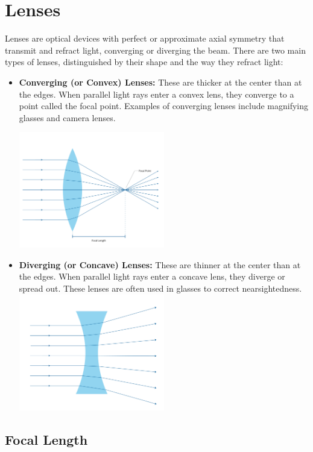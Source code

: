 \chapter{Lenses}

Lenses are optical devices with perfect or approximate axial symmetry
that transmit and refract light, converging or diverging the
beam. There are two main types of lenses, distinguished by their shape
and the way they refract light:

\begin{itemize}
    \item \textbf{Converging (or Convex) Lenses:} These are thicker at
      the center than at the edges. When parallel light rays enter a
      convex lens, they converge to a point called the focal
      point. Examples of converging lenses include magnifying glasses
      and camera lenses.

      \includegraphics[width=0.5\textwidth]{convex.png}

    \item \textbf{Diverging (or Concave) Lenses:} These are thinner at
      the center than at the edges. When parallel light rays enter a
      concave lens, they diverge or spread out. These lenses are often
      used in glasses to correct nearsightedness.
      \includegraphics[width=0.5\textwidth]{concave.png}

\end{itemize}

\section{Focal Length}

